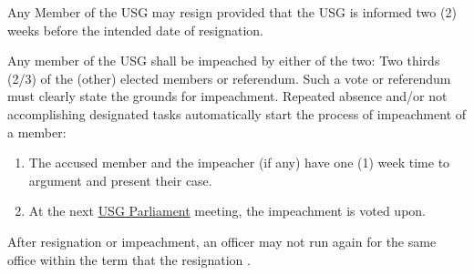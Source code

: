 \begin{parenum}
\item Any Member of the USG may resign provided that the USG is informed two (2) weeks before the intended date of resignation.

\item Any member of the USG shall be impeached by either of the two: Two thirds (2/3) of the (other) elected members or referendum. Such a vote or referendum must clearly state the grounds for impeachment. Repeated absence  and/or not accomplishing designated tasks automatically start the process of impeachment of a member:
\begin{enumerate}
\item The accused member and the impeacher (if any) have one (1) week time to argument and present their case.
\item At the next \hyperref[USGParliamentDef]{USG Parliament} meeting, the impeachment is voted upon.
\end{enumerate}

\item After resignation or impeachment, an officer may not run again for the same office within the term that the resignation .
\end{parenum}
